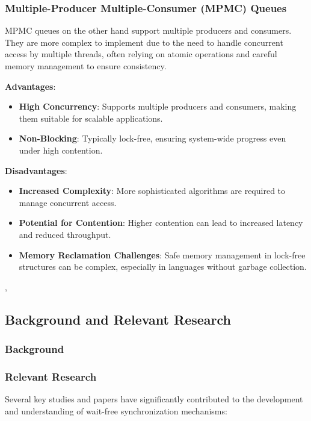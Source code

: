 \documentclass[ a4paper,
                toc=bibliography
              ]{scrartcl}
\begin{document}
\subsubsection{Multiple-Producer Multiple-Consumer (MPMC) Queues}

MPMC queues on the other hand support multiple producers and consumers. They are more complex to implement due to the need to handle concurrent access by multiple threads, often relying on atomic operations and careful memory management to ensure consistency.

\textbf{Advantages}:
\begin{itemize}
	\item \textbf{High Concurrency}: Supports multiple producers and consumers, making them suitable for scalable applications.
	\item \textbf{Non-Blocking}: Typically lock-free, ensuring system-wide progress even under high contention.
\end{itemize}


\textbf{Disadvantages}:
\begin{itemize}
	\item \textbf{Increased Complexity}: More sophisticated algorithms are required to manage concurrent access.
	\item \textbf{Potential for Contention}: Higher contention can lead to increased latency and reduced throughput.
	\item \textbf{Memory Reclamation Challenges}: Safe memory management in lock-free structures can be complex, especially in languages without garbage collection.
\end{itemize}
\cite{Gidenstam2010CacheAwareLockFreeQueues}, \cite{timnat2014practical}

\subsection{Background and Relevant Research}

\subsubsection{Background}



\subsubsection{Relevant Research}

Several key studies and papers have significantly contributed to the development and understanding of wait-free synchronization mechanisms:
\end{document}
